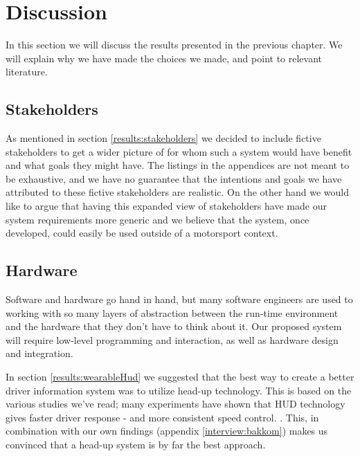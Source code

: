 \chapter{Discussion}
\label{chapter:discussion}

In this section we will discuss the results presented in the previous chapter.
We will explain why we have made the choices we made, and point to relevant
literature. 

\section{Stakeholders}
As mentioned in section \vref{results:stakeholders} we decided to include
fictive stakeholders to get a wider picture of for whom such a system would
have benefit and what goals they might have. The listings in the appendices are
not meant to be exhaustive, and we have no guarantee that the intentions and
goals we have attributed to these fictive stakeholders are realistic. On the
other hand we would like to argue that having this expanded view of
stakeholders have made our system requirements more generic and we believe that
the system, once developed, could easily be used outside of a motorsport
context. 

\section{Hardware}
Software and hardware go hand in hand, but many software engineers are used to
working with so many layers of abstraction between the run-time environment 
and the hardware that they don't have to think about it. Our proposed system will require low-level programming and
interaction, as well as hardware design and integration.

In section \vref{results:wearableHud} we suggested that the best way to create
a better driver information system was to utilize head-up technology. This is
based on the various studies we've read; many experiments have shown that HUD 
technology gives faster driver response - and more consistent speed control. 
\cite{Liu:HudPerformance,lim1999heads,cheng2007intelligentVehicles}. This, in 
combination with our own findings (appendix \vref{interview:bakkom}) makes us 
convinced that a head-up system is by far the best approach.

